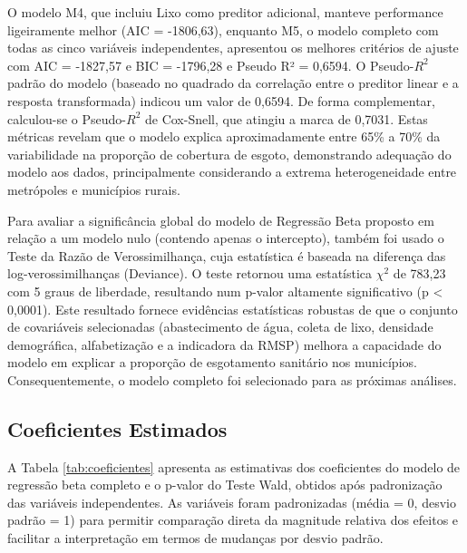 \documentclass[12pt, a4paper]{article}
\begin{document}
O modelo M4, que incluiu Lixo como preditor adicional, manteve performance ligeiramente melhor (AIC = -1806,63), enquanto M5, o modelo completo com todas as cinco variáveis independentes, apresentou os melhores critérios de ajuste com AIC = -1827,57 e BIC = -1796,28 e Pseudo R² = 0,6594. O Pseudo-$R^2$ padrão do modelo (baseado no quadrado da correlação entre o preditor linear e a resposta transformada) indicou um valor de 0,6594. De forma complementar, calculou-se o Pseudo-$R^2$ de Cox-Snell, que atingiu a marca de 0,7031. Estas métricas revelam que o modelo explica aproximadamente entre 65\% a 70\% da variabilidade na proporção de cobertura de esgoto, demonstrando adequação do modelo aos dados, principalmente considerando a extrema heterogeneidade entre metrópoles e municípios rurais. 

Para avaliar a significância global do modelo de Regressão Beta proposto em relação a um modelo nulo (contendo apenas o intercepto), também foi usado o Teste da Razão de Verossimilhança, cuja estatística é baseada na diferença das log-verossimilhanças (Deviance). O teste retornou uma estatística $\chi^2$ de 783,23 com 5 graus de liberdade, resultando num p-valor altamente significativo (p < 0,0001). Este resultado fornece evidências estatísticas robustas de que o conjunto de covariáveis selecionadas (abastecimento de água, coleta de lixo, densidade demográfica, alfabetização e a indicadora da RMSP) melhora a capacidade do modelo em explicar a proporção de esgotamento sanitário nos municípios. Consequentemente, o modelo completo foi selecionado para as próximas análises.

\subsection{Coeficientes Estimados}

A Tabela \ref{tab:coeficientes} apresenta as estimativas dos coeficientes do modelo de regressão beta completo e o p-valor do Teste Wald, obtidos após padronização das variáveis independentes. As variáveis foram padronizadas (média = 0, desvio padrão = 1) para permitir comparação direta da magnitude relativa dos efeitos e facilitar a interpretação em termos de mudanças por desvio padrão.
\end{document}
